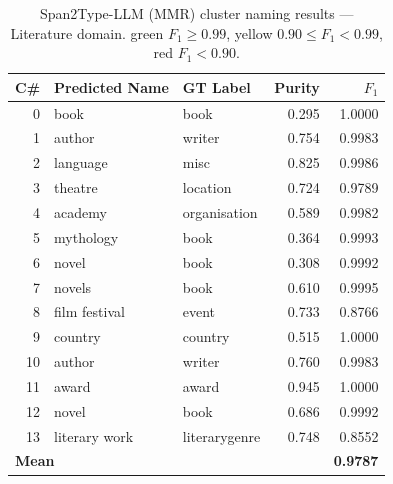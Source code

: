 \documentclass[11pt,a4paper]{article}
\begin{document}
\begin{table}[ht]
\centering
\small
\caption{Span2Type-LLM (MMR) cluster naming results --- Literature domain.
\colorbox{green!15}{green} $F_1 \geq 0.99$,
\colorbox{yellow!25}{yellow} $0.90 \leq F_1 < 0.99$,
\colorbox{red!15}{red} $F_1 < 0.90$.}
\label{tab:naming_literature}
\setlength{\tabcolsep}{5pt}
\begin{tabular}{r l l r r}
\toprule
\textbf{C\#} & \textbf{Predicted Name} & \textbf{GT Label} & \textbf{Purity} & \textbf{$F_1$} \\
\midrule
   0 & book                           & book                   & 0.295 & \cellcolor{green!15}1.0000 \\
   1 & author                         & writer                 & 0.754 & \cellcolor{green!15}0.9983 \\
   2 & language                       & misc                   & 0.825 & \cellcolor{green!15}0.9986 \\
   3 & theatre                        & location               & 0.724 & \cellcolor{yellow!25}0.9789 \\
   4 & academy                        & organisation           & 0.589 & \cellcolor{green!15}0.9982 \\
   5 & mythology                      & book                   & 0.364 & \cellcolor{green!15}0.9993 \\
   6 & novel                          & book                   & 0.308 & \cellcolor{green!15}0.9992 \\
   7 & novels                         & book                   & 0.610 & \cellcolor{green!15}0.9995 \\
   8 & film festival                  & event                  & 0.733 & \cellcolor{red!15}0.8766 \\
   9 & country                        & country                & 0.515 & \cellcolor{green!15}1.0000 \\
  10 & author                         & writer                 & 0.760 & \cellcolor{green!15}0.9983 \\
  11 & award                          & award                  & 0.945 & \cellcolor{green!15}1.0000 \\
  12 & novel                          & book                   & 0.686 & \cellcolor{green!15}0.9992 \\
  13 & literary work                  & literarygenre          & 0.748 & \cellcolor{red!15}0.8552 \\
\midrule
\multicolumn{3}{l}{\textbf{Mean}} & & \textbf{0.9787} \\
\bottomrule
\end{tabular}
\end{table}
\end{document}
